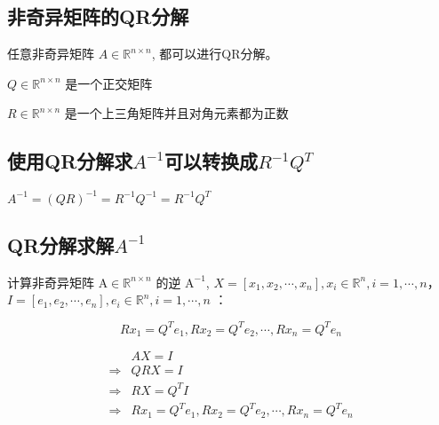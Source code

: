 \subsection{非奇异矩阵的QR分解}

\begin{theorem}
    任意非奇异矩阵 $ A \in \mathbb{R}^{n \times n} $, 都可以进行QR分解。
\end{theorem}

\begin{corollary}
    $ Q \in \mathbb{R}^{n \times n} $ 是一个正交矩阵
\end{corollary}

\begin{corollary}
    $ R \in \mathbb{R}^{n \times n} $ 是一个上三角矩阵并且对角元素都为正数
\end{corollary}


\subsection{使用QR分解求$A^{-1}$可以转换成$R^{-1} Q^{T}$}

\begin{theorem}
    $ A^{-1}=(Q R)^{-1}=R^{-1} Q^{-1}=R^{-1} Q^{T} $
\end{theorem}

\subsection{QR分解求解$A^{-1}$}


计算非奇异矩阵 $ \mathrm{A} \in \mathbb{R}^{n \times n} $ 的逆 $ \mathrm{A}^{-1} $, $X=\left[x_{1}, x_{2}, \cdots, x_{n}\right], x_{i} \in \mathbb{R}^{n}, i=1, \cdots, n$，$I=\left[e_{1}, e_{2}, \cdots, e_{n}\right], e_{i} \in \mathbb{R}^{n}, i=1, \cdots, n$
：

\begin{theorem}[QR分解求解$A^{-1}$]
    $$R x_{1}= Q^{T} e_{1}, R x_{2}=Q^{T} e_{2}, \cdots, R x_{n}=Q^{T} e_{n}$$
\end{theorem}

$$\begin{aligned}
    &AX = I \\
    \Rightarrow&   Q R X=I \\
    \Rightarrow&   R X =Q^{T} I \\
    \Rightarrow&  R x_{1}= Q^{T} e_{1}, R x_{2}=Q^{T} e_{2}, \cdots, R x_{n}=Q^{T} e_{n}
\end{aligned}$$



